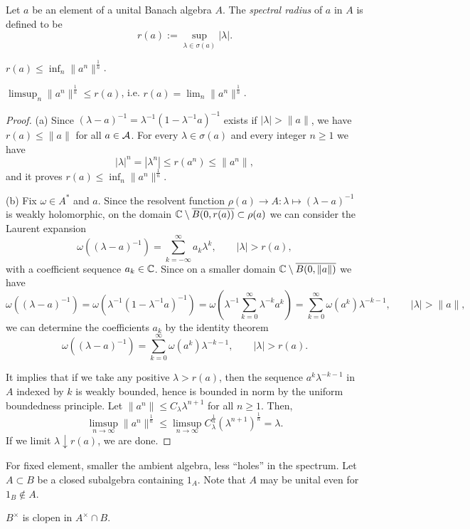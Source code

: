 \documentclass{../../large}
\begin{document}
\begin{prb}
Let $a$ be an element of a unital Banach algebra $A$.
The \emph{spectral radius} of $a$ in $A$ is defined to be
\[r(a):=\sup_{\lambda\in\sigma(a)}|\lambda|.\]
\begin{parts}
\item $r(a)\le\inf_n\|a^n\|^{\frac1n}$.
\item $\limsup_n\|a^n\|^{\frac1n}\le r(a)$, i.e. $r(a)=\lim_n\|a^n\|^{\frac1n}$.
\end{parts}
\end{prb}
\begin{proof}
(a)
Since $(\lambda-a)^{-1}=\lambda^{-1}(1-\lambda^{-1}a)^{-1}$ exists if $|\lambda|>\|a\|$, we have $r(a)\le\|a\|$ for all $a\in\mathcal{A}$.
For every $\lambda\in\sigma(a)$ and every integer $n\ge1$ we have
\[|\lambda|^n=|\lambda^n|\le r(a^n)\le\|a^n\|,\]
and it proves $r(a)\le\inf_n\|a^n\|^{\frac1n}$.

(b)
Fix $\omega\in A^*$ and $a$.
Since the resolvent function $\rho(a)\to A:\lambda\mapsto(\lambda-a)^{-1}$ is weakly holomorphic, on the domain $\mathbb{C}\setminus\overline{B(0,r(a))}\subset\rho(a)$ we can consider the Laurent expansion
\[\omega((\lambda-a)^{-1})=\sum_{k=-\infty}^\infty a_k\lambda^k,\qquad|\lambda|>r(a),\]
with a coefficient sequence $a_k\in\mathbb{C}$.
Since on a smaller domain $\mathbb{C}\setminus\overline{B(0,\|a\|)}$ we have
\[\omega((\lambda-a)^{-1})=\omega(\lambda^{-1}(1-\lambda^{-1}a)^{-1})=\omega(\lambda^{-1}\sum_{k=0}^\infty\lambda^{-k}a^k)=\sum_{k=0}^\infty\omega(a^k)\lambda^{-k-1},\qquad|\lambda|>\|a\|,\]
we can determine the coefficients $a_k$ by the identity theorem
\[\omega((\lambda-a)^{-1})=\sum_{k=0}^\infty\omega(a^k)\lambda^{-k-1},\qquad|\lambda|>r(a).\]

It implies that if we take any positive $\lambda>r(a)$, then the sequence $a^k\lambda^{-k-1}$ in $A$ indexed by $k$ is weakly bounded, hence is bounded in norm by the uniform boundedness principle.
Let $\|a^n\|\le C_\lambda\lambda^{n+1}$ for all $n\ge1$.
Then,
\[\limsup_{n\to\infty}\|a^n\|^{\frac1n}\le\limsup_{n\to\infty}C_\lambda^{\frac1n}(\lambda^{n+1})^{\frac1n}=\lambda.\]
If we limit $\lambda\downarrow r(a)$, we are done.
\end{proof}

\begin{prb}
For fixed element, smaller the ambient algebra, less ``holes'' in the spectrum.
Let $A\subset B$ be a closed subalgebra containing $1_A$.
Note that $A$ may be unital even for $1_B\notin A$.
\begin{parts}
\item $B^\times$ is clopen in $A^\times\cap B$.
\end{parts}
\end{prb}
\end{document}
